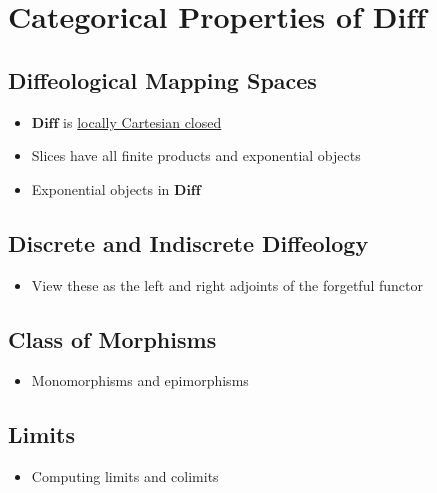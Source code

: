 \documentclass[a4paper,11pt,fleqn]{article}  %
\begin{document}
\section{Categorical Properties of $\textbf{Diff}$}
\subsection*{Diffeological Mapping Spaces}
\begin{itemize}
    \item $\textbf{Diff}$ is \href{https://ncatlab.org/nlab/show/locally+cartesian+closed+category}{locally Cartesian closed}
    \item Slices have all finite products and exponential objects
    \item Exponential objects in $\textbf{Diff}$
\end{itemize}

\subsection*{Discrete and Indiscrete Diffeology}
\begin{itemize}
    \item View these as the left and right adjoints of the forgetful functor
\end{itemize}

\subsection*{Class of Morphisms}
\begin{itemize}
    \item Monomorphisms and epimorphisms
\end{itemize}

\subsection*{Limits}
\begin{itemize}
    \item Computing limits and colimits
\end{itemize}
\end{document}
